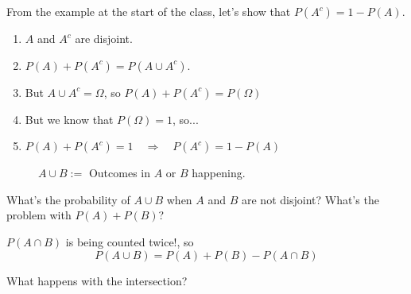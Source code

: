 \documentclass[aspectratio=169]{beamer}
\begin{document}
\begin{frame}

From the example at the start of the class, let's show that $P(A^c)=1-P(A)$.\pause

\begin{enumerate}
    \item $A$ and $A^c$ are disjoint.\pause
    \item $P(A)+P(A^c)=P(A\cup A^c)$.\pause
    \item But $A\cup A^c=\Omega$, so $P(A)+P(A^c)=P(\Omega)$\pause
    \item But we know that $P(\Omega)=1$, so...\pause
    \item $P(A)+P(A^c)=1\quad\Rightarrow \quad P(A^c)=1-P(A)$
\end{enumerate}

\end{frame}

\begin{frame}
   \begin{figure}
       \centering
        
        \caption{$A\cup B:=$ Outcomes in $A$ or $B$ happening.}
        
   \end{figure}
\end{frame}

\begin{frame}
    What's the probability of $A\cup B$ when $A$ and $B$ are not disjoint? What's the problem with $P(A)+P(B)$?
    
    \pause
    
    \vspace{0.5cm}
    
    $P(A\cap B)$ is being counted twice!, so $$P(A\cup B)=P(A)+P(B)-P(A\cap B)$$ \pause

    \vspace{0.5cm}
    
    What happens with the intersection?

\end{frame}
\end{document}
